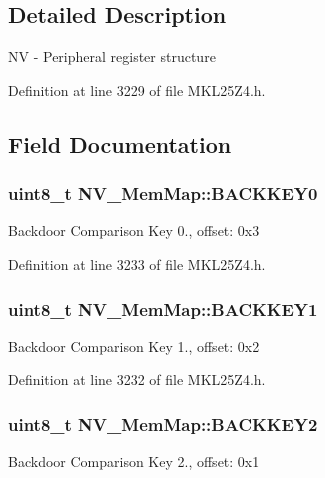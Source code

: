 \subsection{Detailed Description}
NV -\/ Peripheral register structure 

Definition at line 3229 of file M\+K\+L25\+Z4.\+h.



\subsection{Field Documentation}
\subsubsection[{\texorpdfstring{B\+A\+C\+K\+K\+E\+Y0}{BACKKEY0}}]{\setlength{\rightskip}{0pt plus 5cm}uint8\+\_\+t N\+V\+\_\+\+Mem\+Map\+::\+B\+A\+C\+K\+K\+E\+Y0}\hypertarget{struct_n_v___mem_map_ad6d790fea8e791ef5cda3685fe306a08}{}\label{struct_n_v___mem_map_ad6d790fea8e791ef5cda3685fe306a08}
Backdoor Comparison Key 0., offset\+: 0x3 

Definition at line 3233 of file M\+K\+L25\+Z4.\+h.

\subsubsection[{\texorpdfstring{B\+A\+C\+K\+K\+E\+Y1}{BACKKEY1}}]{\setlength{\rightskip}{0pt plus 5cm}uint8\+\_\+t N\+V\+\_\+\+Mem\+Map\+::\+B\+A\+C\+K\+K\+E\+Y1}\hypertarget{struct_n_v___mem_map_ab43748ac2b6d99cef1a62072d17a707b}{}\label{struct_n_v___mem_map_ab43748ac2b6d99cef1a62072d17a707b}
Backdoor Comparison Key 1., offset\+: 0x2 

Definition at line 3232 of file M\+K\+L25\+Z4.\+h.

\subsubsection[{\texorpdfstring{B\+A\+C\+K\+K\+E\+Y2}{BACKKEY2}}]{\setlength{\rightskip}{0pt plus 5cm}uint8\+\_\+t N\+V\+\_\+\+Mem\+Map\+::\+B\+A\+C\+K\+K\+E\+Y2}\hypertarget{struct_n_v___mem_map_af746c853a18c5e8910e556b32073f938}{}\label{struct_n_v___mem_map_af746c853a18c5e8910e556b32073f938}
Backdoor Comparison Key 2., offset\+: 0x1 

